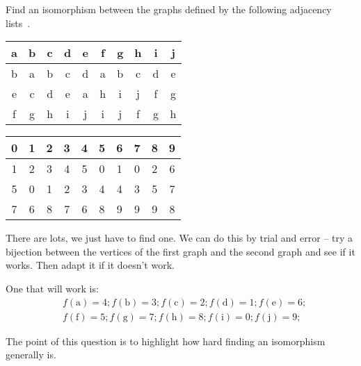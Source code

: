 \documentclass[a4paper, 12pt]{exam}
\begin{document}
\begin{questions}
\question
  Find an isomorphism between the graphs defined by the following adjacency lists~\cite{biggs02}.
  \begin{center}
    \begin{tabular}{cccccccccc}
      a & b & c & d & e & f & g & h & i & j \\
      \hline
      b & a & b & c & d & a & b & c & d & e \\
      e & c & d & e & a & h & i & j & f & g \\
      f & g & h & i & j & i & j & f & g & h 
    \end{tabular}
    \hspace{1cm}
    \begin{tabular}{cccccccccc}
      0 & 1 & 2 & 3 & 4 & 5 & 6 & 7 & 8 & 9 \\
      \hline
      1 & 2 & 3 & 4 & 5 & 0 & 1 & 0 & 2 & 6 \\
      5 & 0 & 1 & 2 & 3 & 4 & 4 & 3 & 5 & 7 \\
      7 & 6 & 8 & 7 & 6 & 8 & 9 & 9 & 9 & 8 
    \end{tabular}
  \end{center}

\begin{solution}
  There are lots, we just have to find one.
  We can do this by trial and error -- try a bijection between the vertices of the first graph and the second graph and see if it works.
  Then adapt it if it doesn't work.
  
  One that will work is:
  \begin{align*}
  &f(\textrm{a}) = 4; f(\textrm{b}) = 3; f(\textrm{c}) = 2; f(\textrm{d}) = 1; f(\textrm{e}) = 6; \\
  &f(\textrm{f}) = 5; f(\textrm{g}) = 7; f(\textrm{h}) = 8; f(\textrm{i}) = 0; f(\textrm{j}) = 9;
  \end{align*}
  
  The point of this question is to highlight how hard finding an isomorphism generally is.
\end{solution}



\end{questions}
\end{document}
